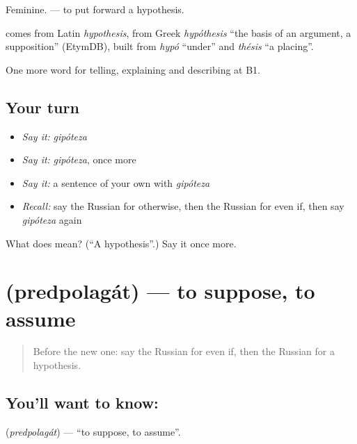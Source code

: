 Feminine. \emph{ } — to put forward a hypothesis.

\begin{cousinweb}
\textbf{} comes from Latin \emph{hypothesis}, from Greek \emph{hypóthesis} \textquotedblleft{}the basis of an argument, a supposition\textquotedblright{} (EtymDB), built from \emph{hypó} \textquotedblleft{}under\textquotedblright{} and \emph{thésis} \textquotedblleft{}a placing\textquotedblright{}.
\end{cousinweb}

\begin{grammarlens}[title={What you've built}]
One more word for telling, explaining and describing at B1.
\end{grammarlens}

\subsection*{Your turn}
\begin{itemize}
\raggedright
  \item \emph{Say it:} \emph{gipóteza}
  \item \emph{Say it:} \emph{gipóteza}, once more
  \item \emph{Say it:} a sentence of your own with \emph{gipóteza}
  \item \emph{Recall:} say the Russian for otherwise, then the Russian for even if, then say \emph{gipóteza} again
\end{itemize}

\begin{tcolorbox}[breakable,colback=teal!4,colframe=teal!35!black,title={Before you move on}]
What does  mean? (\textquotedblleft{}A hypothesis\textquotedblright{}.) Say it once more.
\end{tcolorbox}
\section[\texorpdfstring{\ru{предполагать} (predpolagát)}{предполагать (predpolagát)}]{ (predpolagát) — to suppose, to assume}

\label{lesson:RU-C371-predpolagat}



\begin{quote}
Before the new one: say the Russian for even if, then the Russian for a hypothesis.
\end{quote}

\subsection*{You'll want to know: }
\textbf{} (\emph{predpolagát}) — \textquotedblleft{}to suppose, to assume\textquotedblright{}.

